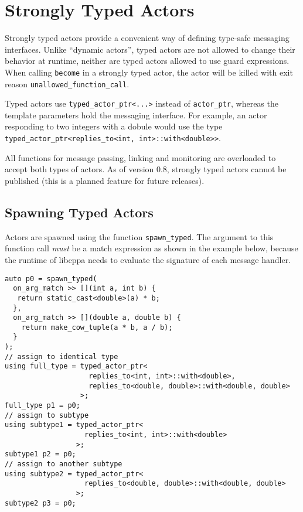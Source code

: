 \section{Strongly Typed Actors}

Strongly typed actors provide a convenient way of defining type-safe messaging interfaces.
Unlike ``dynamic actors'', typed actors are not allowed to change their behavior at runtime, neither are typed actors allowed to use guard expressions.
When calling \lstinline^become^ in a strongly typed actor, the actor will be killed with exit reason \lstinline^unallowed_function_call^.

Typed actors use \lstinline^typed_actor_ptr<...>^ instead of \lstinline^actor_ptr^, whereas the template parameters hold the messaging interface.
For example, an actor responding to two integers with a dobule would use the type \lstinline^typed_actor_ptr<replies_to<int, int>::with<double>>^.

All functions for message passing, linking and monitoring are overloaded to accept both types of actors.
As of version 0.8, strongly typed actors cannot be published (this is a planned feature for future releases).

\subsection{Spawning Typed Actors}
\label{sec:strong:spawn}

Actors are spawned using the function \lstinline^spawn_typed^.
The argument to this function call \emph{must} be a match expression as shown in the example below, because the runtime of libcppa needs to evaluate the signature of each message handler.

\begin{lstlisting}
auto p0 = spawn_typed(
  on_arg_match >> [](int a, int b) {
   return static_cast<double>(a) * b;
  },
  on_arg_match >> [](double a, double b) {
    return make_cow_tuple(a * b, a / b);
  }
);
// assign to identical type
using full_type = typed_actor_ptr<
                    replies_to<int, int>::with<double>,
                    replies_to<double, double>::with<double, double>
                  >;
full_type p1 = p0;
// assign to subtype
using subtype1 = typed_actor_ptr<
                   replies_to<int, int>::with<double>
                 >;
subtype1 p2 = p0;
// assign to another subtype
using subtype2 = typed_actor_ptr<
                   replies_to<double, double>::with<double, double>
                 >;
subtype2 p3 = p0;
\end{lstlisting}

